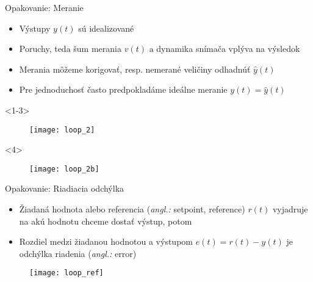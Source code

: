 \documentclass{beamer}
\newcommand{\angl}[1]{{\color{gray}(\emph{angl.:} #1)}}
\begin{document}
\begin{frame}{Opakovanie: Meranie}
  \begin{itemize}
    \item<1-> Výstupy $y(t)$ sú idealizované
    \item<2-> Poruchy, teda šum merania $v(t)$ a dynamika snímača vplýva na výsledok
    \item<3-> Merania môžeme korigovať, resp. nemerané veličiny odhadnúť $\hat{y}(t)$
    \item<4-> Pre jednoduchosť často predpokladáme ideálne meranie ${y}(t)=\hat{y}(t)$
  \end{itemize}

\begin{onlyenv}<1-3>
\begin{figure}
\centering
  \texttt{[image: loop\_2]}\\
\end{figure}
\end{onlyenv}


\begin{onlyenv}<4>
\begin{figure}
\centering
  \texttt{[image: loop\_2b]}\\
\end{figure}
\end{onlyenv}
\end{frame}

\begin{frame}{Opakovanie: Riadiacia odchýlka}
  \begin{itemize}
    \item<1-> Žiadaná hodnota alebo referencia \angl{setpoint, reference} $r(t)$ vyjadruje na akú hodnotu chceme dostať výstup, potom
    \item<2-> Rozdiel medzi žiadanou hodnotou a výstupom $e(t)=r(t)-y(t)$ je odchýlka riadenia \angl{error}
  \end{itemize}

\begin{figure}
\centering
  \texttt{[image: loop\_ref]}\\
\end{figure}
\end{frame}
\end{document}

